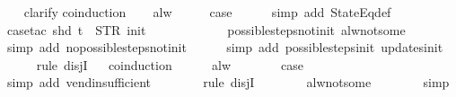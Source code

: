 \begin{isabellebody}
\ \ \isamarkupfalse%
\ clarify\isanewline
{}\isamarkupfalse%
{\isacharparenleft}coinduction{\isacharparenright}\isanewline
\ \ \isamarkupfalse%
\ alw\isanewline
\ \ \isamarkupfalse%
\ \isamarkupfalse%
\ {\isacharquery}case\isanewline
\ \ \ \ \isamarkupfalse%
\ {\isacharparenleft}simp\ add{\isacharcolon}\ StateEq{\isacharunderscore}def{\isacharparenright}\isanewline
\ \ \ \ \isamarkupfalse%
\ {\isacharparenleft}case{\isacharunderscore}tac\ {\isachardoublequoteopen}shd\ t\ {\isacharequal}\ {\isacharparenleft}STR\ {\isacharprime}{\isacharprime}init{\isacharprime}{\isacharprime}{\isacharcomma}\ {\isacharbrackleft}{\isacharbrackright}{\isacharparenright}{\isachardoublequoteclose}{\isacharparenright}\isanewline
\ \ \ \ \ \isamarkupfalse%
\isanewline
\ \ \ \ \isamarkupfalse%
\ possible{\isacharunderscore}steps{\isacharunderscore}not{\isacharunderscore}init\ alw{\isacharunderscore}not{\isacharunderscore}some\isanewline
\ \ \ \ \ \isamarkupfalse%
\ {\isacharparenleft}simp\ add{\isacharcolon}\ no{\isacharunderscore}possible{\isacharunderscore}steps{\isacharunderscore}not{\isacharunderscore}init{\isacharparenright}\isanewline
\ \ \ \ \isamarkupfalse%
\ {\isacharparenleft}simp\ add{\isacharcolon}\ possible{\isacharunderscore}steps{\isacharunderscore}init\ updates{\isacharunderscore}init{\isacharparenright}\isanewline
\ \ \ \ \isamarkupfalse%
\ {\isacharparenleft}rule\ disjI{}{\isacharparenright}\isanewline
\ \ \isamarkupfalse%
{\isacharparenleft}coinduction{\isacharparenright}\isanewline
\ \ \ \ \isamarkupfalse%
\ alw\isanewline
\ \ \ \ \isamarkupfalse%
\ \isamarkupfalse%
\ {\isacharquery}case\isanewline
\ \ \ \ \ \ \isamarkupfalse%
\ {\isacharparenleft}simp\ add{\isacharcolon}\ vend{\isacharunderscore}insufficient{\isacharparenright}\isanewline
\ \ \ \ \ \ \isamarkupfalse%
\ {\isacharparenleft}rule\ disjI{}{\isacharparenright}\isanewline
\ \ \ \ \ \ \isamarkupfalse%
\ alw{\isacharunderscore}not{\isacharunderscore}some\isanewline
\ \ \ \ \ \ \isamarkupfalse%
\ simp\isanewline
\ \ \isamarkupfalse%
\isanewline
{}\isamarkupfalse%
%
\endisatagproof
{\isafoldproof}%
%
\isadelimproof
%
\endisadelimproof
%
\end{isabellebody}

